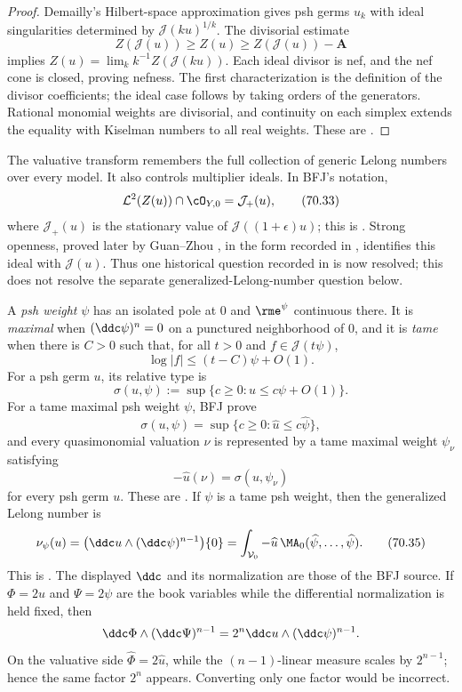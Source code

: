 \begin{proof}
Demailly's Hilbert-space approximation gives psh germs $u_k$ with ideal
singularities determined by $\mathcal J(ku)^{1/k}$.  The divisorial
estimate
\[
 Z(\mathcal J(u))\geq Z(u)
            \geq Z(\mathcal J(u))-\mathbf A
\tag{70.32}\label{eq:local-demailly-divisor-estimate}
\]
implies
$Z(u)=\lim_k k^{-1}Z(\mathcal J(ku))$.  Each ideal divisor is nef, and
the nef cone is closed, proving nefness.  The first characterization is the
definition of the divisor coefficients; the ideal case follows by taking
orders of the generators.  Rational monomial weights are divisorial, and
continuity on each simplex extends the equality with Kiselman numbers to all
real weights.  These are \cite[Theorem~5.1 and
Proposition~5.6]{BFJ08}.
\end{proof}

The valuative transform remembers the full collection of generic Lelong
numbers over every model.  It also controls multiplier ideals.  In BFJ's
notation,
\[
                 \mathcal L^2(Z(u))\cap\cO_{Y,0}
                    =\mathcal J_+(u),
\tag{70.33}\label{eq:local-valuative-multiplier}
\]
where $\mathcal J_+(u)$ is the stationary value of
$\mathcal J((1+\epsilon)u)$; this is
\cite[Theorem~5.5]{BFJ08}.  Strong openness, proved later by
Guan--Zhou \cite[Theorem~1.1]{GZ15}, in the form recorded in
, identifies this ideal with $\mathcal J(u)$.
Thus one historical question recorded in \cite{BFJ08} is now resolved; this
does not resolve the separate generalized-Lelong-number question below.

A \emph{psh weight} $\psi$ has an isolated pole at $0$ and
$\rme^\psi$ continuous there.  It is \emph{maximal} when
$(\ddc\psi)^n=0$ on a punctured neighborhood of $0$, and it is
\emph{tame} when there is $C>0$ such that, for all $t>0$ and
$f\in\mathcal J(t\psi)$,
\[
                    \log|f|\leq(t-C)\psi+O(1).
\]
For a psh germ $u$, its relative type is
\[
 \sigma(u,\psi):=\sup\{c\geq0:u\leq c\psi+O(1)\}.
\]
For a tame maximal psh weight $\psi$, BFJ prove
\[
\sigma(u,\psi)
 =\sup\{c\geq0:\widehat u\leq c\widehat\psi\},
\tag{70.34}\label{eq:local-relative-type}
\]
and every quasimonomial valuation $\nu$ is represented by a tame maximal
weight $\psi_\nu$ satisfying
\[
                      -\widehat u(\nu)=\sigma(u,\psi_\nu)
\]
for every psh germ $u$.  These are
\cite[Theorems~5.12--5.13]{BFJ08}.  If $\psi$ is a tame psh weight, then
the generalized Lelong number is
\[
 \nu_\psi(u)
 =\bigl(\ddc u\wedge(\ddc\psi)^{n-1}\bigr)\{0\}
 =\int_{\mathcal V_0}-\widehat u\,
             \MA_0(\widehat\psi,\ldots,\widehat\psi).
\tag{70.35}\label{eq:local-generalized-lelong}
\]
This is \cite[Theorem~B]{BFJ08}.  The displayed $\ddc$ and its
normalization are those of the BFJ source.  If
$\Phi=2u$ and $\Psi=2\psi$ are the book variables while the differential
normalization is held fixed, then
\[
 \ddc\Phi\wedge(\ddc\Psi)^{n-1}
    =2^n\ddc u\wedge(\ddc\psi)^{n-1}.
\]
On the valuative side $\widehat\Phi=2\widehat u$, while the
$(n-1)$-linear measure scales by $2^{n-1}$; hence the same factor
$2^n$ appears.  Converting only one factor would be incorrect.

